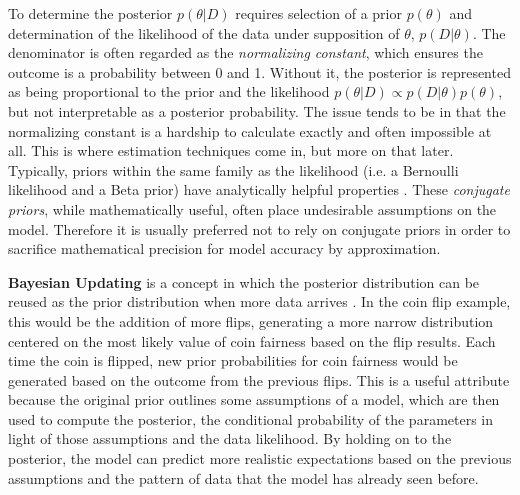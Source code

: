 To determine the posterior $p(\theta|D)$ requires selection of a prior $p(\theta)$ and determination of the likelihood of the data under supposition of $\theta$, $p(D|\theta)$.  The denominator is often regarded as the \textit{normalizing constant}, which ensures the outcome is a probability between 0 and 1.  Without it, the posterior is represented as being proportional to the prior and the likelihood $p(\theta|D) \propto p(D|\theta)p(\theta)$, but not interpretable as a posterior probability.  The issue tends to be in that the normalizing constant is a hardship to calculate exactly and often impossible at all.  This is where estimation techniques come in, but more on that later.
Typically, priors within the same family as the likelihood (i.e. a Bernoulli likelihood and a Beta prior) have analytically helpful properties \cite{mullachery2018bayesian}. These \textit{conjugate priors}, while mathematically useful, often place undesirable assumptions on the model.  Therefore it is usually preferred not to rely on conjugate priors in order to sacrifice mathematical precision for model accuracy by approximation.

\textbf{Bayesian Updating} is a concept in which the posterior distribution can be reused as the prior distribution when more data arrives \cite{mcelreath2016statistical}.  In the coin flip example, this would be the addition of more flips, generating a more narrow distribution centered on the most likely value of coin fairness based on the flip results.  Each time the coin is flipped, new prior probabilities for coin fairness would be generated based on the outcome from the previous flips.  This is a useful attribute because the original prior outlines some assumptions of a model, which are then used to compute the posterior, the conditional probability of the parameters in light of those assumptions and the data likelihood.  By holding on to the posterior, the model can predict more realistic expectations based on the previous assumptions and the pattern of data that the model has already seen before.





